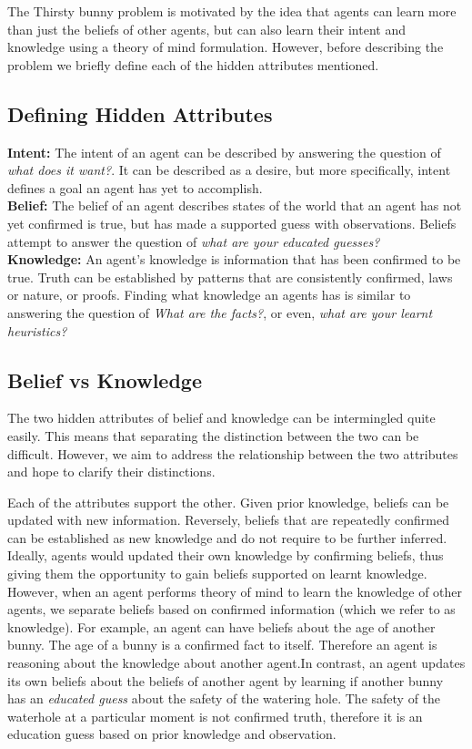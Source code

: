 \documentclass[twocolumn]{article}
\begin{document}
 The Thirsty bunny problem is motivated by the idea that agents can learn more than just the beliefs of other agents, but can also learn their intent and knowledge using a theory of mind formulation. However, before describing the problem we briefly define each of the hidden attributes mentioned. 

\subsection{Defining Hidden Attributes}

\noindent \textbf{Intent:} The intent of an agent can be described by answering the question of \textit{what does it want?}. It can be described as a desire, but more specifically, intent defines a goal an agent has yet to accomplish. \\

\noindent \textbf{Belief:} The belief of an agent describes states of the world that an agent has not yet confirmed is true, but has made a supported guess with observations. Beliefs attempt to answer the question of \textit{what are your educated guesses?}\\

\noindent \textbf{Knowledge:} An agent's knowledge is information that has been confirmed to be true. Truth can be established by patterns that are consistently confirmed, laws or nature, or proofs. Finding what knowledge an agents has is similar to answering the question of \textit{What are the facts?}, or even, \textit{what are your learnt heuristics?}

\subsection{Belief vs Knowledge} The two hidden attributes of belief and knowledge can be intermingled quite easily. This means that separating the distinction between the two can be difficult. However, we aim to address the relationship between the two attributes and hope to clarify their distinctions. 

Each of the attributes support the other. Given prior knowledge, beliefs can be updated with new information. Reversely, beliefs that are repeatedly confirmed can be established as new knowledge and do not require to be further inferred. Ideally, agents would updated their own knowledge by confirming beliefs, thus giving them the opportunity to gain beliefs supported on learnt knowledge. However, when an agent performs theory of mind to learn the knowledge of other agents, we separate beliefs based on confirmed information (which we refer to as knowledge). For example, an agent can have beliefs about the age of another bunny. The age of a bunny is a confirmed fact to itself. Therefore an agent is reasoning about the knowledge about another agent.In contrast, an agent updates its own beliefs about the beliefs of another agent by learning if another bunny has an \textit{educated guess} about the safety of the watering hole. The safety of the waterhole at a particular moment is not confirmed truth, therefore it is an education guess based on prior knowledge and observation. 
\end{document}

